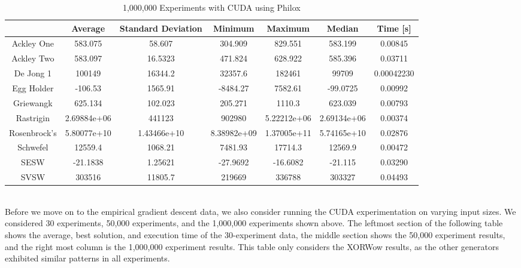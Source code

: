 \documentclass{article}
\begin{document}
        \begin{table}[h!]
            \begin{centering}
                \begin{tabular}{|c||c|c|c|c|c|c|}
                    \hline
                                & Average & Standard Deviation & Minimum & Maximum & Median & Time [s] \\
                    \hline
                    \hline
                    Ackley One & 583.075 & 58.607 & 304.909 & 829.551 & 583.199 & 0.00845 \\
                    \hline
                    Ackley Two & 583.097 & 16.5323 & 471.824 & 628.922 & 585.396 & 0.03711 \\
                    \hline
                    De Jong 1 & 100149 & 16344.2 & 32357.6 & 182461 & 99709 & 0.00042230\\
                    \hline
                    Egg Holder & -106.53 & 1565.91 & -8484.27 & 7582.61 & -99.0725 & 0.00992 \\
                    \hline
                    Griewangk & 625.134 & 102.023 & 205.271 & 1110.3 & 623.039 & 0.00793 \\
                    \hline
                    Rastrigin & 2.69884e+06 & 441123 & 902980 & 5.22212e+06 & 2.69134e+06 & 0.00374 \\
                    \hline
                    Rosenbrock's & 5.80077e+10 & 1.43466e+10 & 8.38982e+09 & 1.37005e+11 & 5.74165e+10 & 0.02876 \\
                    \hline
                    Schwefel & 12559.4 & 1068.21 & 7481.93 & 17714.3 & 12569.9 & 0.00472 \\
                    \hline
                    SESW & -21.1838 & 1.25621 & -27.9692 & -16.6082 & -21.115 & 0.03290\\
                    \hline
                    SVSW & 303516 & 11805.7 & 219669 & 336788 & 303327 & 0.04493\\
                    \hline
                \end{tabular}
                \caption{1,000,000 Experiments with CUDA using Philox}
            \end{centering}
            \end{table}
$ $ \\
Before we move on to the empirical gradient descent data, we also consider running the CUDA experimentation on varying input sizes. We considered 30 experiments, 50,000 experiments, and the 1,000,000 experiments shown above. The leftmost section of the following table shows the average, best solution, and execution time of the 30-experiment data, the middle section shows the 50,000 experiment results, and the right most column is the 1,000,000 experiment results. This table only considers the XORWow results, as the other generators exhibited similar patterns in all experiments.
\end{document}
